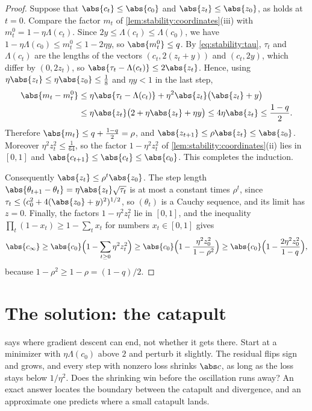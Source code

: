 \begin{refsection}
\begin{proof}
Suppose that $\abs{c_t}\le\abs{c_0}$ and $\abs{z_t}\le\abs{z_0}$, as holds at $t=0$. Compare the factor $m_t$ of \cref{lem:stability:coordinates}(iii) with $m_t^0=1-\eta\Lambda(c_t)$. Since $2y\le\Lambda(c_t)\le\Lambda(c_0)$, we have $1-\eta\Lambda(c_0)\le m_t^0\le1-2\eta y$, so $\abs{m_t^0}\le q$. By \eqref{eq:stability:tau}, $\tau_t$ and $\Lambda(c_t)$ are the lengths of the vectors $(c_t,2(z_t+y))$ and $(c_t,2y)$, which differ by $(0,2z_t)$, so $\abs{\tau_t-\Lambda(c_t)}\le2\abs{z_t}$. Hence, using $\eta\abs{z_t}\le\eta\abs{z_0}\le\frac18$ and $\eta y<1$ in the last step,
\[
  \begin{aligned}
  \abs{m_t-m_t^0}&\le\eta\abs{\tau_t-\Lambda(c_t)}+\eta^2\abs{z_t}\bigl(\abs{z_t}+y\bigr)\\
  &\le\eta\abs{z_t}\bigl(2+\eta\abs{z_t}+\eta y\bigr)\le4\eta\abs{z_t}\le\frac{1-q}{2}.
  \end{aligned}
\]
Therefore $\abs{m_t}\le q+\frac{1-q}2=\rho$, and $\abs{z_{t+1}}\le\rho\abs{z_t}\le\abs{z_0}$. Moreover $\eta^2z_t^2\le\frac1{64}$, so the factor $1-\eta^2z_t^2$ of \cref{lem:stability:coordinates}(ii) lies in $[0,1]$ and $\abs{c_{t+1}}\le\abs{c_t}\le\abs{c_0}$. This completes the induction.

Consequently $\abs{z_t}\le\rho^t\abs{z_0}$. The step length $\abs{\theta_{t+1}-\theta_t}=\eta\abs{z_t}\sqrt{\tau_t}$ is at most a constant times $\rho^t$, since $\tau_t\le(c_0^2+4(\abs{z_0}+y)^2)^{1/2}$, so $(\theta_t)$ is a Cauchy sequence, and its limit has $z=0$. Finally, the factors $1-\eta^2z_t^2$ lie in $[0,1]$, and the inequality $\prod_t(1-x_t)\ge1-\sum_tx_t$ for numbers $x_t\in[0,1]$ gives
\[
  \abs{c_\infty}\ge\abs{c_0}\Bigl(1-\sum_{t\ge0}\eta^2z_t^2\Bigr)\ge\abs{c_0}\Bigl(1-\frac{\eta^2z_0^2}{1-\rho^2}\Bigr)\ge\abs{c_0}\Bigl(1-\frac{2\eta^2z_0^2}{1-q}\Bigr),
\]
because $1-\rho^2\ge1-\rho=(1-q)/2$.
\end{proof}

\section{The solution: the catapult}\label{sec:stability:catapult}

 says where gradient descent can end, not whether it gets there. Start at a minimizer with $\eta\Lambda(c_0)$ above $2$ and perturb it slightly. The residual flips sign and grows, and every step with nonzero loss shrinks $\abs c$, as long as the loss stays below $1/\eta^2$. Does the shrinking win before the oscillation runs away? An exact answer locates the boundary between the catapult and divergence, and an approximate one predicts where a small catapult lands.


\end{refsection}
